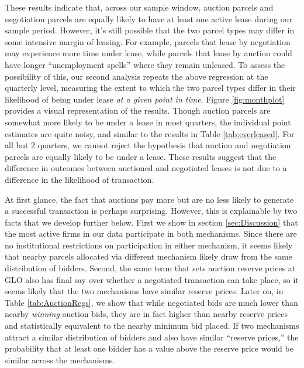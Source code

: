 \documentclass[12pt]{article}
\begin{document}
These results indicate that, across our sample window, auction parcels and negotiation parcels are equally likely to have at least one active lease during our sample period. However, it's still possible that the two parcel types may differ in some intensive margin of leasing.  For example, parcels that lease by negotiation may experience more time under lease, while parcels that lease by auction could have longer ``unemployment spells'' where they remain unleased. To assess the possibility of this, our second analysis repeats the above regression at the quarterly level, measuring the extent to which the two parcel types differ in their likelihood of being under lease \textit{at a given point in time}. Figure \ref{fig:monthplot} provides a visual representation of the results. Though auction parcels are somewhat more likely to be under a lease in most quarters, the individual point estimates are quite noisy, and similar to the results in Table \ref{tab:everleased}.  For all but 2 quarters, we cannot reject the hypothesis that auction and negotiation parcels are equally likely to be under a lease.  These results suggest that the difference in outcomes between auctioned and negotiated leases is not due to a difference in the likelihood of transaction.

At first glance, the fact that auctions pay more but are no less likely to generate a successful transaction is perhaps surprising. However, this is explainable by two facts that we develop further below. First we show in section \ref{sec:Discussion} that the most active firms in our data participate in both mechanisms. Since there are no institutional restrictions on participation in either mechanism, it seems likely that nearby parcels allocated via different mechanism likely draw from the same distribution of bidders. Second, the same team that sets auction reserve prices at GLO also has final say over whether a negotiated transaction can take place, so it seems likely that the two mechanisms have similar reserve prices. Later on, in Table \ref{tab:AuctionRegs}, we show that while negotiated bids are much lower than nearby \emph{winning} auction bids, they are in fact higher than nearby reserve prices and statistically equivalent to the nearby minimum bid placed. If two mechanisms attract a similar distribution of bidders and also have similar ``reserve prices,'' the probability that at least one bidder has a value above the reserve price would be similar across the mechanisms. 
\end{document}
